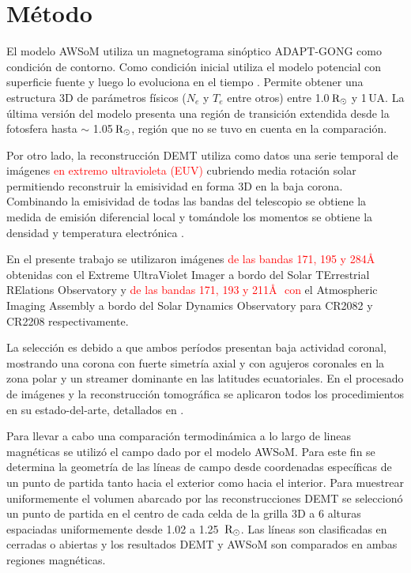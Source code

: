 \documentclass[baaa]{baaa}
\begin{document}
\section{Método}
El modelo AWSoM utiliza un magnetograma sinóptico ADAPT-GONG \citep{arge_2010} como condición de contorno. Como condición inicial utiliza el modelo potencial con superficie fuente y luego lo evoluciona en el tiempo \citep{vander_2010}. Permite obtener una estructura 3D de parámetros físicos ($N_e$ y $T_e$ entre otros) entre 1.0$\,{\rm R_\odot}$ y 1$\,$UA. La última versión del modelo presenta una región de transición extendida desde la fotosfera hasta $\sim$ 1.05$\,{\rm R_\odot}$, región que no se tuvo en cuenta en la comparación.


Por otro lado, la reconstrucción DEMT utiliza como datos una serie temporal de imágenes \textcolor{red}{en extremo ultravioleta (EUV)} cubriendo media rotación solar permitiendo reconstruir la emisividad en forma 3D en la baja corona. Combinando la emisividad de todas las bandas del telescopio se obtiene la \rm{medida de emisión diferencial local} y tomándole los momentos se obtiene la densidad y temperatura electrónica \citep{frazin_2009}.  

En el presente trabajo se utilizaron imágenes \textcolor{red}{de las bandas 171, 195 y 284\AA} obtenidas con el Extreme UltraViolet Imager \textcolor{red}{\citep{wuelser_2004}} a bordo del Solar TErrestrial RElations Observatory y \textcolor{red}{de las bandas 171, 193 y 211\AA \,\ con} el Atmospheric Imaging Assembly \textcolor{red}{\citep{lemen_2012}} a bordo del Solar Dynamics Observatory para CR2082 y CR2208 respectivamente.



La selección es debido a que ambos períodos presentan baja actividad coronal, mostrando una corona con fuerte simetría axial y con agujeros coronales en la zona polar y un streamer dominante en las latitudes ecuatoriales. En el procesado de imágenes y la reconstrucción tomográfica se aplicaron todos los procedimientos en su estado-del-arte, detallados en \citet{lloveras_ba2017}.



Para llevar a cabo una comparación termodinámica a lo largo de lineas magnéticas se utilizó el campo dado por el modelo AWSoM. Para este fin se determina la geometría de las líneas de campo desde coordenadas específicas de un punto de partida tanto hacia el exterior como hacia el interior. Para muestrear uniformemente el volumen abarcado por las reconstrucciones DEMT se seleccionó un punto de partida en el centro de cada celda de la grilla 3D a 6 alturas espaciadas uniformemente desde 1.02 a 1.25 $\,{\rm R_\odot}$. Las líneas son clasificadas en cerradas o abiertas y los resultados DEMT y AWSoM son comparados en ambas regiones magnéticas.
\end{document}
